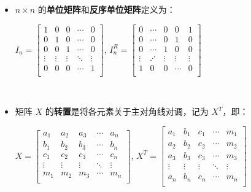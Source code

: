 \begin{tcolorbox}[title={\textbf{\tboxdef{\ref*{subsec:vandermonde}} 矩阵}}]


\begin{itemize}

\item $n \times n$ 的\textbf{单位矩阵}和\textbf{反序单位矩阵}定义为：

$I_n = \begin{bmatrix}
1 & 0 & 0 & \cdots & 0\\
0 & 1 & 0 & \cdots & 0 \\
0 & 0 & 1 & \cdots & 0 \\
\vdots & \vdots & \vdots & \ddots & \vdots \\
0 & 0 & 0 & \cdots & 1 \\
\end{bmatrix}$, $I^R_n = \begin{bmatrix}
0 & \cdots & 0 & 0 & 1\\
0 & \cdots & 0 & 1 & 0 \\
0 & \cdots & 1 & 0 & 0 \\
\vdots & \iddots & \vdots & \vdots & \vdots \\
1 & 0 & 0 & \cdots & 0 \\
\end{bmatrix}$

$ $

\item 矩阵 $X$ 的\textbf{转置}是将各元素关于主对角线对调，记为 $X^T$，即：


$X = \begin{bmatrix}
a_1 & a_2 & a_3 & \cdots & a_n\\
b_1 & b_2 & b_3 & \cdots & b_n \\
c_1 & c_2 & c_3 & \cdots & c_n \\
\vdots & \vdots & \vdots & \ddots & \vdots \\
m_1 & m_2 & m_3 & \cdots & m_n \\
\end{bmatrix}$, $X^T = \begin{bmatrix}
a_1 & b_1 & c_1 & \cdots & m_1\\
a_2 & b_2 & c_2 & \cdots & m_2\\
a_3 & b_3 & c_3 & \cdots & m_3\\
\vdots & \vdots & \vdots & \ddots & \vdots \\
a_n & b_n & c_n & \cdots & m_n\\
\end{bmatrix}$


\end{itemize}
\end{tcolorbox}
